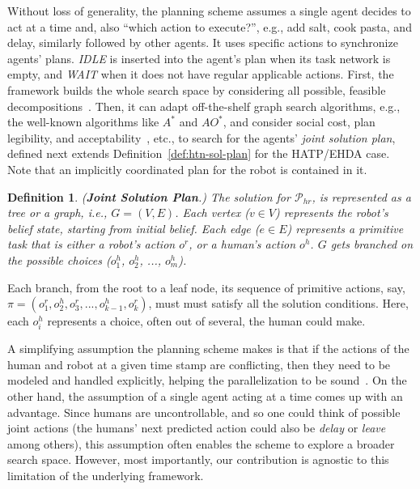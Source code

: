 \documentclass[letterpaper]{article} %
\newtheorem{definition}{Definition}
\begin{document}
Without loss of generality, the planning scheme assumes a single agent decides to act at a time and, also ``which action to execute?'', e.g., add salt, cook pasta, and delay, similarly followed by other agents. 
It uses specific actions to synchronize agents' plans. {\em IDLE} is inserted into the agent's plan when its task network is empty, and {\em WAIT} when it does not have regular applicable actions. First, the framework builds the whole search space by considering all possible, feasible decompositions~\cite{buisan:hal-03684211}. 
Then, it can adapt off-the-shelf graph search algorithms, e.g., the well-known algorithms like $A^*$ and $AO^*$, and consider social cost, plan legibility, and acceptability~\cite{alili2009task}, etc., to search for the agents' \textit{joint solution plan}, defined next extends Definition~\ref{def:htn-sol-plan} for the HATP/EHDA case. Note that an implicitly coordinated plan for the robot is contained in it. 

\begin{definition} \label{def:joint-sol-plan}
(\textbf{Joint Solution Plan}.) 
{The solution for $\mathcal{P}_{hr}$, is represented as a tree or a graph, i.e., $G=(V,E)$. Each vertex ($v \in V$) represents the robot's belief state, starting from initial belief. Each edge ($e \in E$) represents a primitive task that is either a robot's action $o^{r}$, or a human's action $o^{h}$. $G$ gets branched on the possible choices ($o^{h}_1$, $o^{h}_2$, ..., $o^{h}_m$). 
}  
\end{definition}

Each branch, from the root to a leaf node, its sequence of primitive actions, say,  $\pi=(o_1^r,o_2^h,o_3^r,...,o_{k-1}^h,o_k^r)$, must must satisfy all the solution conditions. 
Here, each $o_i^h$ represents a choice, often out of several, the human could make.

A simplifying assumption the planning scheme makes is that if the actions of the human and robot at a given time stamp are conflicting, then they need to be modeled and handled explicitly, helping the parallelization to be sound~\cite{CrosbyJR14,ShekharB20}.
On the other hand, the assumption of a single agent acting at a time comes up with an advantage. Since humans are uncontrollable, and so one could think of possible joint actions (the humans' next predicted action could also be \textit{delay} or \textit{leave} among others), this assumption often enables the scheme to explore a broader search space. 
However, most importantly, our contribution is agnostic to this limitation of the underlying framework.
\end{document}
